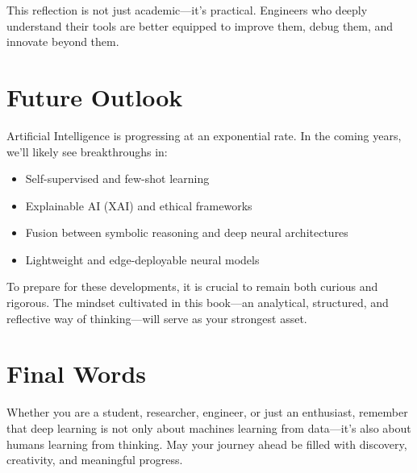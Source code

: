 \documentclass{book}
\begin{document}
\begin{multicols}{2}
This reflection is not just academic—it’s practical. Engineers who deeply understand their tools are better equipped to improve them, debug them, and innovate beyond them.

\section*{Future Outlook}
Artificial Intelligence is progressing at an exponential rate. In the coming years, we’ll likely see breakthroughs in:

\begin{itemize}
  \item Self-supervised and few-shot learning
  \item Explainable AI (XAI) and ethical frameworks
  \item Fusion between symbolic reasoning and deep neural architectures
  \item Lightweight and edge-deployable neural models
\end{itemize}

To prepare for these developments, it is crucial to remain both curious and rigorous. The mindset cultivated in this book—an analytical, structured, and reflective way of thinking—will serve as your strongest asset.

\section*{Final Words}
Whether you are a student, researcher, engineer, or just an enthusiast, remember that deep learning is not only about machines learning from data—it’s also about humans learning from thinking. May your journey ahead be filled with discovery, creativity, and meaningful progress.

\end{multicols}
\end{document}

